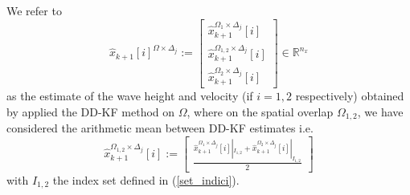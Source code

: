 \documentclass[smallcondensed]{svjour3}
\begin{document}
\begin{enumerate}
We refer to 
\begin{equation}
\widehat{x}_{k+1}[i]^{\Omega\times \Delta_{j}}:=\left[\begin{array}{ll}
\widehat{x}_{k+1}^{\Omega_{1}\times \Delta_{j}}[i]\\
\widehat{x}_{k+1}^{\Omega_{1,2}\times \Delta_{j}}[i]\\
\widehat{x}_{k+1}^{\Omega_{2} \times \Delta_{j}}[i]
\end{array}\right]\in \mathbb{R}^{n_{x}}
\end{equation}
as the estimate of the wave height and velocity (if $i=1,2$ respectively) obtained by applied the DD-KF method on $\Omega$, where on the spatial overlap $\Omega_{1,2}$, we have considered the arithmetic mean between DD-KF estimates i.e.
\begin{equation}
 \widehat{x}_{k+1}^{\Omega_{1,2}\times \Delta_{j}}[i]:=\left[\begin{array}{ll}
 \frac{\widehat{x}_{k+1}^{\Omega_{1}\times \Delta_{j}}[i]|_{I_{1,2}
}+ \widehat{x}_{k+1}^{\Omega_{2}\times \Delta_{j}}[i]|_{I_{1,2}
}}{2} \end{array}\right]
\end{equation}
with $I_{1,2}$ the index set defined in (\ref{set_indici}).
\end{enumerate}
\end{document}
